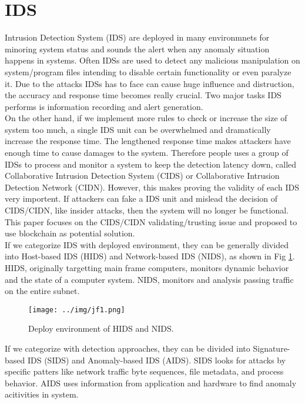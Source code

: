 \documentclass[12pt]{report}
\begin{document}
\section{IDS}
Intrusion Detection System (IDS) \cite{NIST_IDPS} are deployed in many environmnets for minoring system status and sounds the alert when any anomaly situation happens in systems. Often IDSs are used to detect any malicious manipulation on system/program files intending to disable certain functionality or even paralyze it. Due to the attacks IDSs has to face can cause huge influence and distruction, the accuracy and response time becomes really crucial. Two major tasks IDS performs is information recording and alert generation. \\

On the other hand, if we implement more rules to check or increase the size of system too much, a single IDS unit can be overwhelmed and dramatically increase the response time. The lengthened response time makes attackers have enough time to cause damages to the system. Therefore people uses a group of IDSs to process and monitor a system to keep the detection latency down, called Collaborative Intrusion Detection System (CIDS) or Collaborative Intrusion Detection Network (CIDN). However, this makes proving the validity of each IDS very importent. If attackers can fake a IDS unit and mislead the decision of CIDS/CIDN, like insider attacks, then the system will no longer be functional. This paper focuses on the CIDS/CIDN validating/trusting issue and proposed to use blockchain as potential solution. \\

If we categorize IDS with deployed environment, they can be generally divided into Host-based IDS (HIDS) and Network-based IDS (NIDS), as shown in Fig \ref{fig:jf1}. \cite{McAfee_next_gen_IDS}\cite{wiki_IDS}\cite{wiki_HIDS} HIDS, originally targetting main frame computers, monitors dynamic behavior and the state of a computer system. NIDS, monitors and analysis passing traffic on the entire subnet. \\

\begin{figure}[H]
	\centering
	\texttt{[image: ../img/jf1.png]}
	\caption{Deploy environment of HIDS and NIDS. \cite{8274922}}
	\label{fig:jf1}
\end{figure}

If we categorize with detection approaches, they can be divided into Signature-based IDS (SIDS) and Anomaly-based IDS (AIDS). \cite{wiki_IDS} SIDS looks for attacks by specific patters like network traffic byte sequences, file metadata, and process behavior. AIDS uses information from application and hardware to find anomaly acitivities in system. \\
\end{document}

